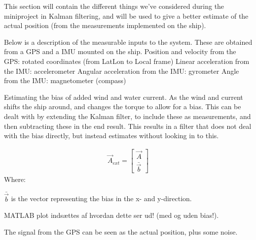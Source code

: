 This section will contain the different things we've considered during the miniproject in Kalman filtering, and will be used to give a better estimate of the actual position (from the measurements implemented on the ship).

Below is a description of the measurable inputs to the system. These are obtained from a \ac{GPS} and a \ac{IMU} mounted on the ship.
Position and velocity from the \ac{GPS}: rotated coordinates (from LatLon to Local frame)
Linear acceleration from the \ac{IMU}: accelerometer
Angular acceleration from the \ac{IMU}: gyrometer
Angle from the \ac{IMU}: magnetometer (compass)

Estimating the bias of added wind and water current. As the wind and current shifts the ship around, and changes the torque to allow for a bias. This can be dealt with by extending the Kalman filter, to include these as measurements, and then subtracting these in the end result. This results in a filter that does not deal with the bias directly, but instead estimates without looking in to this. 

\begin{align}
\vec{A}_{ext} = \begin{bmatrix}
\vec{A}\\
\bar{\vec{b}}
\end{bmatrix}
\end{align}
\noindent Where:
\begin{ffk}
$\bar{\vec{b}}$ is the vector representing the bias in the x- and y-direction. 
\end{ffk}

MATLAB plot indsættes af hvordan dette ser ud! (med og uden bias!).

The signal from the GPS can be seen as the actual position, plus some noise. 
